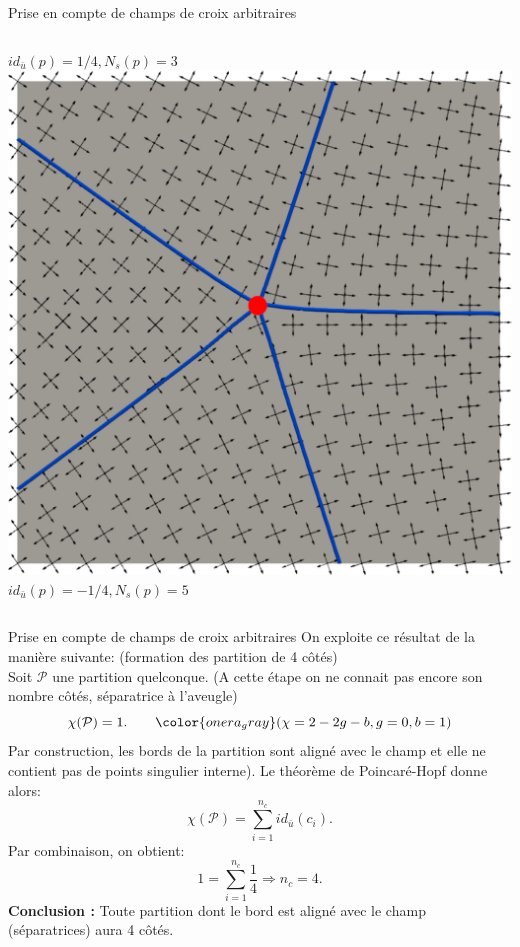 \documentclass[compress,10pt,aspectratio=169]{beamer}
\begin{document}
\begin{frame}{Prise en compte de champs de croix arbitraires}
\begin{columns}
\begin{column}{0.3\textwidth}
  \scriptsize $id_{\bar{u}}(p)=1/4, N_s(p) = 3$
  \\\vspace{0.1cm}
  \includegraphics[scale=0.1]{images/sepa_5.pdf}
  \scriptsize $id_{\bar{u}}(p)=-1/4, N_s(p) = 5$
  \\\vspace{0.3cm}
    \end{column}
\end{columns}

\end{frame}

\begin{frame}{Prise en compte de champs de croix arbitraires}%
\small
\vspace{-0.2cm}
On exploite ce résultat de la manière suivante: {\color{onera_gray} (formation des partition de 4 côtés)}\\\vspace{0.1cm}
 Soit $\mathcal{P}$ une partition quelconque. {\color{onera_gray} (A cette étape on ne connait pas encore son nombre côtés, séparatrice à l'aveugle)}
$$\chi(\mathcal{P})=1. \quad\quad{\color{onera_gray} (\chi=2-2g-b, g=0, b=1)}$$
Par construction, les bords de la partition sont aligné avec le champ et elle ne contient pas de points singulier interne). Le théorème de Poincaré-Hopf donne alors:
$$\chi(\mathcal{P})=\sum_{i=1}^{n_c}id_{\bar{u}}(c_i).$$
Par combinaison, on obtient:
$$1=\sum_{i=1}^{n_c}\frac{1}{4}\Longrightarrow n_c=4.$$
\textbf{Conclusion :} Toute partition dont le bord est aligné avec le champ (séparatrices) aura 4 côtés.
\vspace{0.4cm}
\end{frame}
\end{document}
